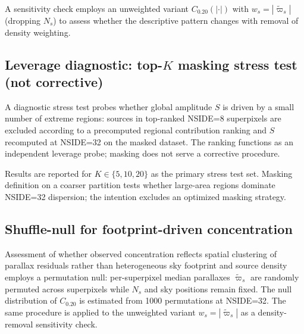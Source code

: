 A sensitivity check employs an unweighted variant $C_{0.20}(|\cdot|)$ with $w_s = |\tilde{\varpi}_s|$ (dropping $N_s$) to assess whether the descriptive pattern changes with removal of density weighting.

\subsection{\texorpdfstring{Leverage diagnostic: top-\texorpdfstring{$K$}{K} masking stress test}{Leverage diagnostic: top-K masking stress test} (not corrective)}
A diagnostic stress test probes whether global amplitude $S$ is driven by a small number of extreme regions: sources in top-ranked NSIDE=8 superpixels are excluded according to a precomputed regional contribution ranking and $S$ recomputed at NSIDE=32 on the masked dataset. The ranking functions as an independent leverage probe; masking does not serve a corrective procedure.

Results are reported for $K \in \{5,10,20\}$ as the primary stress test set. Masking definition on a coarser partition tests whether large-area regions dominate NSIDE=32 dispersion; the intention excludes an optimized masking strategy.

\subsection{Shuffle-null for footprint-driven concentration}
Assessment of whether observed concentration reflects spatial clustering of parallax residuals rather than heterogeneous sky footprint and source density employs a permutation null: per-superpixel median parallaxes $\tilde{\varpi}_s$ are randomly permuted across superpixels while $N_s$ and sky positions remain fixed. The null distribution of $C_{0.20}$ is estimated from 1000 permutations at NSIDE=32. The same procedure is applied to the unweighted variant $w_s = |\tilde{\varpi}_s|$ as a density-removal sensitivity check.

